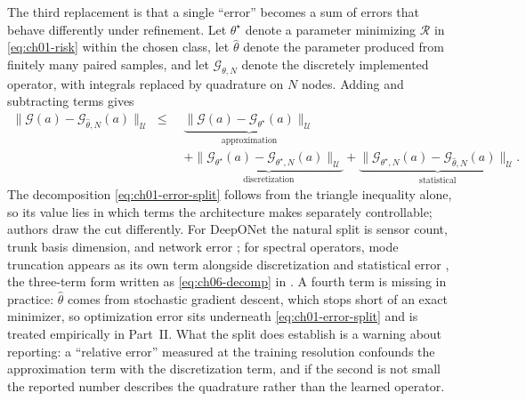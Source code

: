 The third replacement is that a single ``error'' becomes a sum of errors that behave
differently under refinement. Let $\theta^{\star}$ denote a parameter minimizing
$\mathcal{R}$ in \eqref{eq:ch01-risk} within the chosen class, let $\widehat{\theta}$ denote
the parameter produced from finitely many paired samples, and let $\mathcal{G}_{\theta, N}$
denote the discretely implemented operator, with integrals replaced by quadrature on $N$
nodes. Adding and subtracting terms gives
\begin{equation}
  \label{eq:ch01-error-split}
  \begin{aligned}
    \big\|\mathcal{G}(a) - \mathcal{G}_{\widehat{\theta}, N}(a)\big\|_{\mathcal{U}}
    \;\leq\;&
    \underbrace{\big\|\mathcal{G}(a) - \mathcal{G}_{\theta^{\star}}(a)\big\|_{\mathcal{U}}}_{\text{approximation}}
    \\
    &+ \underbrace{\big\|\mathcal{G}_{\theta^{\star}}(a) - \mathcal{G}_{\theta^{\star}, N}(a)\big\|_{\mathcal{U}}}_{\text{discretization}}
    + \underbrace{\big\|\mathcal{G}_{\theta^{\star}, N}(a) - \mathcal{G}_{\widehat{\theta}, N}(a)\big\|_{\mathcal{U}}}_{\text{statistical}} .
  \end{aligned}
\end{equation}
The decomposition \eqref{eq:ch01-error-split} follows from the triangle inequality alone, so
its value lies in which terms the architecture makes separately controllable; authors draw
the cut differently. For DeepONet the natural split is sensor count, trunk basis dimension,
and network error \cite{lanthaler2022error}; for spectral operators, mode truncation appears
as its own term alongside discretization and statistical error
\cite{subedi2024controlling}, the three-term form written as \eqref{eq:ch06-decomp} in
. A fourth term is missing in
practice: $\widehat{\theta}$ comes from stochastic gradient descent, which stops short of an exact
minimizer, so optimization error sits underneath \eqref{eq:ch01-error-split} and is treated
empirically in Part~II. What the split does establish is a warning about reporting: a
``relative error'' measured at the training resolution confounds the approximation term with
the discretization term, and if the second is not small the reported number describes the
quadrature rather than the learned operator.

